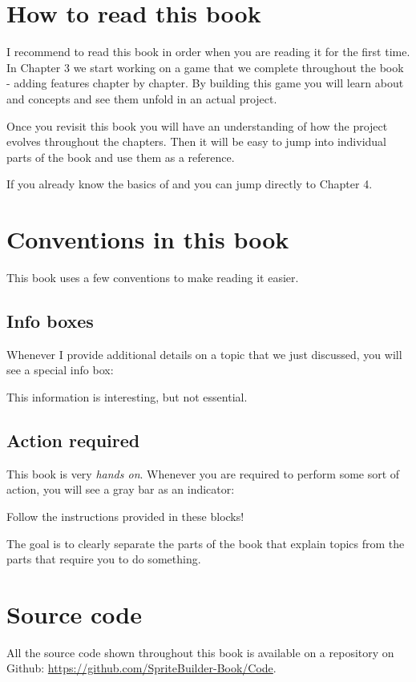 \section{How to read this book}
I recommend to read this book in order when you are reading it for the first
time. In Chapter 3 we start working on a game that we complete throughout the
book - adding features chapter by chapter. By building this game you will learn
about \SB{} and \cocos{} concepts and see them unfold in an actual project.

Once you revisit this book you will have an understanding of how the project
evolves throughout the chapters. Then it will be easy to jump into individual
parts of the book and use them as a reference.

If you already know the basics of \cocos{} and \SB{} you can jump directly to
Chapter 4.

\section{Conventions in this book}
This book uses a few conventions to make reading it easier. 

\subsection{Info boxes}
Whenever I provide additional details on a topic that we just discussed, you
will see a special info box:
\begin{details}
This information is interesting, but not essential.
\end{details}

\subsection{Action required}
This book is very \textit{hands on}. Whenever you are required to perform some
sort of action, you will see a gray bar as an indicator:

\begin{leftbar}
Follow the instructions provided in these blocks!
\end{leftbar}

The goal is to clearly separate the parts of the book that explain topics from
the parts that require you to do something.

\section{Source code}
All the source code shown throughout this book is available on a repository on
Github: \url{https://github.com/SpriteBuilder-Book/Code}. 

